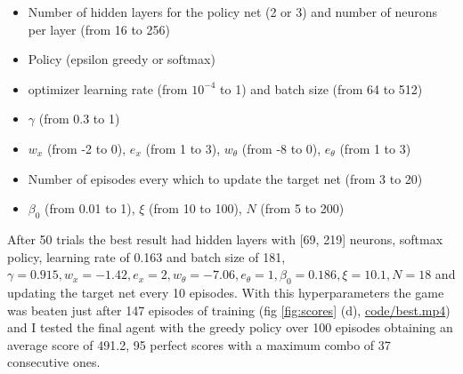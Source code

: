 \documentclass[a4paper, 11pt]{article}
\begin{document}
  \begin{itemize}
    \item Number of hidden layers for the policy net (2 or 3) and number of neurons per layer (from 16 to 256)
    \item Policy (epsilon greedy or softmax)
    \item optimizer learning rate (from $10^{-4}$ to 1) and batch size (from 64 to 512)
    \item $\gamma$ (from 0.3 to 1)
    \item $w_x$ (from -2 to 0), $e_x$ (from 1 to 3), $w_\theta$ (from -8 to 0), $e_\theta$ (from 1 to 3)
    \item Number of episodes every which to update the target net (from 3 to 20)
    \item $\beta_0$ (from 0.01 to 1), $\xi$ (from 10 to 100), $N$ (from 5 to 200)
  \end{itemize}

  After 50 trials the best result had hidden layers with [69, 219] neurons, softmax policy, learning rate of 0.163 and batch size of 181, $\gamma = 0.915, w_x=-1.42, e_x=2, w_\theta=-7.06, e_\theta=1, \beta_0=0.186, \xi=10.1, N=18$ and updating the target net every 10 episodes. With this hyperparameters the game was beaten just after 147 episodes of training (fig \ref{fig:scores} (d), \url{code/best.mp4}) and I tested the final agent with the greedy policy over 100 episodes obtaining an average score of 491.2, 95 perfect scores with a maximum combo of 37 consecutive ones.
\end{document}
